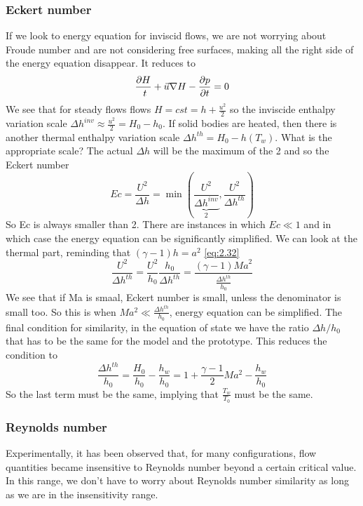 		\subsubsection{Eckert number}
			If we look to energy equation for inviscid flows, we are not worrying about Froude number and are not considering free surfaces, making all the right side of the energy equation disappear. It reduces to 
			\begin{equation}
				\frac{\partial H}{\ t} + \vec{u} \nabla H - \frac{\partial p}{\partial t} = 0
			\end{equation}
			We see that for steady flows flows $H = cst = h +\frac{u^2}{2}$ so the inviscide enthalpy variation scale $\Delta h ^{inv} \approx \frac{u^2}{2} = H_0 - h_0$. If solid bodies are heated, then there is another thermal enthalpy variation scale $\Delta h^{th} = H_0 - h(T_w)$. What is the appropriate scale? The actual $\Delta h$ will be the maximum of the 2 and so the Eckert number
			\begin{equation}
				Ec = \frac{U^2}{\Delta h} = \min \left( \underbrace{\frac{U^2}{\Delta h ^{inv}}}_{2}, \frac{U^2}{\Delta h ^{th}} \right)
			\end{equation}			 
			So Ec is always smaller than 2. There are instances in which $Ec \ll 1$ and in which case the energy equation can be significantly simplified. We can look at the thermal part, reminding that $(\gamma -1)h = a^2$ \eqref{eq:2.32}
			\begin{equation}
				\frac{U^2}{\Delta h ^{th}} = \frac{U^2}{h_0}\frac{h_0}{\Delta h^{th}} = \frac{(\gamma - 1){Ma}^2}{\frac{\Delta h^{th}}{h_0}}
			\end{equation}
			We see that if Ma is smaal, Eckert number is small, unless the denominator is small too. So this is when $Ma^2 \ll \frac{\Delta h^{th}}{h_0}$, energy equation can be simplified. The final condition for similarity, in the equation of state we have the ratio $\Delta h /h_0$ that has to be the same for the model and the prototype. This reduces the condition to 
			\begin{equation}
				\frac{\Delta h^{th}}{h_0} = \frac{H_0}{h_0} - \frac{h_w}{h_0} = 1 + \frac{\gamma -1 }{2} Ma^2 - \frac{h_w}{h_0} 
			\end{equation}
			So the last term must be the same, implying that $\frac{T_w}{T_0}$ must be the same. 
			
		\subsubsection{Reynolds number}
			Experimentally, it has been observed that, for many configurations,  flow quantities became insensitive to Reynolds number beyond a certain critical value. In this range, we don't have to worry about Reynolds number similarity as long as we are in the insensitivity range. 
			

